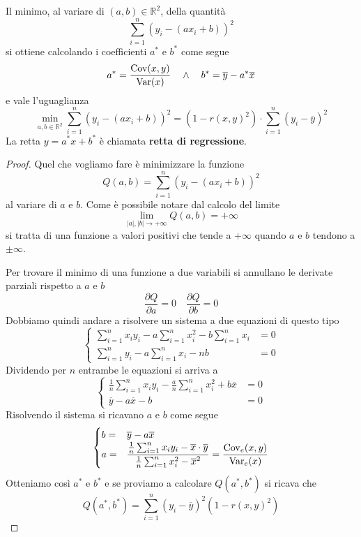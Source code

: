 \begin{theorem}
	Il minimo, al variare di $(a, b) \in \mathbb{R}^2$, della quantità
	\[ \sum_{i=1}^n (y_i - (a x_i + b))^2 \]
	si ottiene calcolando i coefficienti $a^*$ e $b^*$ come segue
	\[ a^* = \frac{\operatorname{Cov}(x, y)}{\operatorname{Var}(x)} \quad \wedge \quad b^* = \overline{y} - a^* \overline{x} \]
	e vale l'uguaglianza
	\[
		\min_{a, b \in \mathbb{R}^2} \sum_{i=1}^n (y_i - (a x_i + b))^2 =
		(1 - r(x, y)^2) \cdot \sum_{i=1}^n (y_i - \overline{y})^2
	\]
	La retta $y = a^* x + b^*$ è chiamata \textbf{retta di regressione}.
	\begin{proof}
		Quel che vogliamo fare è minimizzare la funzione
		\[ Q(a, b) = \sum_{i=1}^n (y_i - (a x_i + b))^2 \]
		al variare di $a$ e $b$. Come è possibile notare dal calcolo del limite
		\[ \lim_{|a|, |b| \to +\infty} Q(a, b) = +\infty \]
		si tratta di una funzione a valori positivi che tende a $+\infty$ quando $a$ e $b$ tendono a
		$\pm\infty$.

		Per trovare il minimo di una funzione a due variabili si annullano le derivate parziali rispetto a
		$a$ e $b$
		\[ \frac{\partial Q}{\partial a} = 0 \quad \frac{\partial Q}{\partial b} = 0 \]
		Dobbiamo quindi andare a risolvere un sistema a due equazioni di questo tipo
		\[
			\begin{cases}
				\sum_{i=1}^n x_i y_i - a \sum_{i=1}^n x_i^2 - b \sum_{i=1}^n x_i & = 0 \\
				\sum_{i=1}^n y_i - a \sum_{i=1}^n x_i - n b                      & = 0
			\end{cases}
		\]
		Dividendo per $n$ entrambe le equazioni si arriva a
		\[
			\begin{cases}
				\frac{1}{n} \sum_{i=1}^n x_i y_i - \frac{a}{n} \sum_{i=1}^n x_i^2 + b \overline{x} & = 0 \\
				\overline{y} - a \overline{x} - b                                                  & = 0
			\end{cases}
		\]
		Risolvendo il sistema si ricavano $a$ e $b$ come segue
		\[
			\begin{cases}
				b = & \overline{y} - a \overline{x}                         \\
				a = & \displaystyle\frac{\frac{1}{n} \sum_{i=1}^n x_i y_i -
					\overline{x} \cdot \overline{y}}
				{\frac{1}{n} \sum_{i=1}^n x_i^2 - \overline{x}^2} =
				\frac{\operatorname{Cov}_e(x, y)}{\operatorname{Var}_e(x)}
			\end{cases}
		\]
		Otteniamo così $a^*$ e $b^*$ e se proviamo a calcolare $Q(a^*, b^*)$ si ricava che
		\[ Q(a^*, b^*) = \sum_{i=1}^n (y_i - \overline{y})^2 (1 - r(x, y)^2) \]
	\end{proof}
\end{theorem}

